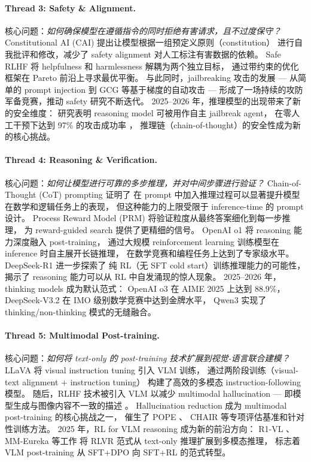 \paragraph{Thread 3: Safety \& Alignment.}
核心问题：\textit{如何确保模型在遵循指令的同时拒绝有害请求，且不过度保守？}
Constitutional AI (CAI) \cite{bai2022constitutional} 提出让模型根据一组预定义原则（constitution）
进行自我批评和修改，减少了 safety alignment 对人工标注有害数据的依赖。
Safe RLHF \cite{dai2024saferlhf} 将 helpfulness 和 harmlessness 解耦为两个独立目标，
通过带约束的优化框架在 Pareto 前沿上寻求最优平衡。
与此同时，jailbreaking 攻击的发展 ---
从简单的 prompt injection 到 GCG \cite{zou2023gcg} 等基于梯度的自动攻击 ---
形成了一场持续的攻防军备竞赛，推动 safety 研究不断迭代。
2025--2026 年，推理模型的出现带来了新的安全维度：
研究表明 reasoning model 可被用作自主 jailbreak agent，
在零人工干预下达到 97\% 的攻击成功率 \cite{hagendorff2026jailbreakagents}，
推理链（chain-of-thought）的安全性成为新的核心挑战。

\paragraph{Thread 4: Reasoning \& Verification.}
核心问题：\textit{如何让模型进行可靠的多步推理，并对中间步骤进行验证？}
Chain-of-Thought (CoT) prompting \cite{wei2022cot} 证明了
在 prompt 中加入推理过程可以显著提升模型在数学和逻辑任务上的表现，
但这种能力的上限受限于 inference-time 的 prompt 设计。
Process Reward Model (PRM) \cite{lightman2023prm} 将验证粒度从最终答案细化到每一步推理，
为 reward-guided search 提供了更精细的信号。
OpenAI o1 \cite{openai2024o1} 将 reasoning 能力深度融入 post-training，
通过大规模 reinforcement learning 训练模型在 inference 时自主展开长链推理，
在数学竞赛和编程任务上达到了专家级水平。
DeepSeek-R1 \cite{deepseek2025r1} 进一步探索了
纯 RL（无 SFT cold start）训练推理能力的可能性，
揭示了 reasoning 能力可以从 RL 中自发涌现的惊人现象。
2025--2026 年，thinking models 成为默认范式：
OpenAI o3 \cite{openai2025o3} 在 AIME 2025 上达到 88.9\%，
DeepSeek-V3.2 \cite{deepseek2025v32} 在 IMO 级别数学竞赛中达到金牌水平，
Qwen3 \cite{yang2025qwen3} 实现了 thinking/non-thinking 模式的无缝融合。

\paragraph{Thread 5: Multimodal Post-training.}
核心问题：\textit{如何将 text-only 的 post-training 技术扩展到视觉-语言联合建模？}
LLaVA \cite{liu2023llava} 将 visual instruction tuning 引入 VLM 训练，
通过两阶段训练（visual-text alignment + instruction tuning）
构建了高效的多模态 instruction-following 模型。
随后，RLHF 技术被引入 VLM 以减少 multimodal hallucination ---
即模型生成与图像内容不一致的描述
\cite{sun2023rlhfv,yu2024rlhfv}。
Hallucination reduction 成为 multimodal post-training 的核心挑战之一，
催生了 POPE \cite{li2023pope}、
CHAIR 等专项评估基准和针对性训练方法。
2025 年，RL for VLM reasoning 成为新的前沿方向：
R1-VL \cite{zhang2025r1vl}、MM-Eureka \cite{meng2025mmeureka} 等工作
将 RLVR 范式从 text-only 推理扩展到多模态推理，
标志着 VLM post-training 从 SFT+DPO 向 SFT+RL 的范式转型。

